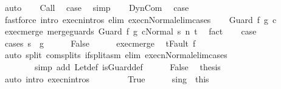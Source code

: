 \begin{isabellebody}
\ {\isacharparenleft}auto{\isacharparenright}\isanewline
{}\isamarkupfalse%
\isanewline
\ \ \isamarkupfalse%
\ Call\ \isamarkupfalse%
\ {\isacharquery}case\ \isamarkupfalse%
\ simp\isanewline
{}\isamarkupfalse%
\isanewline
\ \ \isamarkupfalse%
\ DynCom\ \isamarkupfalse%
\ {\isacharquery}case\isanewline
\ \ \ \ \isamarkupfalse%
\ {\isacharparenleft}fastforce\ intro{\isacharcolon}\ execn{\isachardot}intros\ elim{\isacharcolon}\ execn{\isacharunderscore}Normal{\isacharunderscore}elim{\isacharunderscore}cases{\isacharparenright}\isanewline
{}\isamarkupfalse%
\isanewline
\ \ \isamarkupfalse%
\ {\isacharparenleft}Guard\ f\ g\ c{\isacharparenright}\isanewline
\ \ \isamarkupfalse%
\ exec{\isacharunderscore}merge{\isacharcolon}\ {\isachardoublequoteopen}{\isasymGamma}{\isasymturnstile}{\isasymlangle}merge{\isacharunderscore}guards\ {\isacharparenleft}Guard\ f\ g\ c{\isacharparenright}{\isacharcomma}Normal\ s{\isasymrangle}\ {\isacharequal}n{\isasymRightarrow}\ t{\isachardoublequoteclose}\ \isamarkupfalse%
\ fact\isanewline
\ \ \isamarkupfalse%
\ {\isacharquery}case\isanewline
\ \ \isamarkupfalse%
\ {\isacharparenleft}cases\ {\isachardoublequoteopen}s\ {\isasymin}\ g{\isachardoublequoteclose}{\isacharparenright}\isanewline
\ \ \ \ \isamarkupfalse%
\ False\isanewline
\ \ \ \ \isamarkupfalse%
\ exec{\isacharunderscore}merge\ \isamarkupfalse%
\ {\isachardoublequoteopen}t{\isacharequal}Fault\ f{\isachardoublequoteclose}\isanewline
\ \ \ \ \ \ \isamarkupfalse%
\ {\isacharparenleft}auto\ split{\isacharcolon}\ com{\isachardot}splits\ if{\isacharunderscore}split{\isacharunderscore}asm\ elim{\isacharcolon}\ execn{\isacharunderscore}Normal{\isacharunderscore}elim{\isacharunderscore}cases\ \isanewline
\ \ \ \ \ \ \ \ simp\ add{\isacharcolon}\ Let{\isacharunderscore}def\ is{\isacharunderscore}Guard{\isacharunderscore}def{\isacharparenright}\isanewline
\ \ \ \ \isamarkupfalse%
\ False\ \isamarkupfalse%
\ {\isacharquery}thesis\isanewline
\ \ \ \ \ \ \isamarkupfalse%
\ {\isacharparenleft}auto\ intro{\isacharcolon}\ execn{\isachardot}intros{\isacharparenright}\isanewline
\ \ \isamarkupfalse%
\isanewline
\ \ \ \ \isamarkupfalse%
\ True\isanewline
\ \ \ \ \isamarkupfalse%
\ s{\isacharunderscore}in{\isacharunderscore}g\ {\isacharequal}\ this\isanewline

\end{isabellebody}
